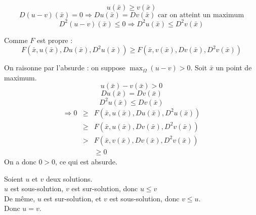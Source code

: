 
\begin{dem}
\[u(\bar{x})\geq v(\bar{x})\]
\[D(u-v)(\bar{x})=0 \Rightarrow Du(\bar{x})=Dv(\bar{x}) \text{ car on atteint un maximum}\]
\[D^2(u-v)(\bar{x})\leq0 \Rightarrow D^2u(\bar{x})\leq D^2v(\bar{x})\]

Comme $F$ est propre : \[F(\bar{x}, u(\bar{x}), Du(\bar{x}), D^2u(\bar{x}))\geq F(\bar{x}, v(\bar{x}), Dv(\bar{x}), D^2v(\bar{x}))\]
\end{dem}



\begin{dem}
On raisonne par l'absurde : on suppose $\max_\Omega (u-v)>0$. Soit $\bar{x}$ un point de maximum.\\
\[u(\bar{x})-v(\bar{x})>0\]
\[Du(\bar{x})=Dv(\bar{x}) \]
\[D^2u(\bar{x})\leq Dv(\bar{x})\]
\begin{eqnarray*}
\Rightarrow 0&\geq&F(\bar{x}, u(\bar{x}), Du(\bar{x}), D^2u(\bar{x}))\\
		&\geq& F(\bar{x}, u(\bar{x}), Dv(\bar{x}), D^2v(\bar{x}))\\
		&>& F(\bar{x}, v(\bar{x}), Dv(\bar{x}), D^2v(\bar{x}))\\
		& & \geq 0
\end{eqnarray*}
On a donc $0>0$, ce qui est absurde.
\end{dem}



\begin{dem}
Soient $u$ et $v$ deux solutions.\\
$u$ est sous-solution, $v$ est sur-solution, donc $u\leq v$\\
De même, $u$ est sur-solution, et $v$ est sous-solution, donc $v\leq u$.\\
Donc $u=v$.
\end{dem}

